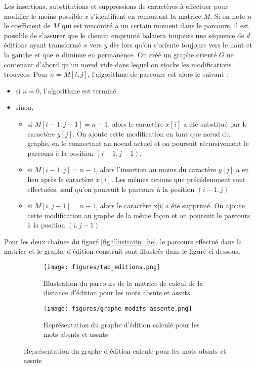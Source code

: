 \documentclass[12pt, twoside]{report}
\begin{document}
Les insertions, substitutions et suppressions de caractères à effectuer pour modifier le moins possible $x$ s'identifient en remontant la matrice $M$. Si on note $n$ le coefficient de $M$ qui est rencontré à un certain moment dans le parcours, il est possible de s'assurer que le chemin emprunté balaiera toujours une séquence de $d$ éditions ayant transformé $x$ vers $y$ dès lors qu'on s'oriente toujours vers \og{} le haut et la gauche \fg{} et que $n$ diminue en permanence. On créé un graphe orienté $G$ ne contenant d'abord qu'un n\oe{}ud vide dans lequel on stocke les modifications trouvées.\autocite[chap. 2]{jurafsky} Pour $n=M[i,j]$, l'algorithme de parcours est alors le suivant :
\begin{itemize}
    \item si $n=0$, l'algorithme est terminé.
    \item sinon, \begin{itemize}
        \item si $M[i-1, j-1] = n-1$, alors le caractère $x[i]$ a été substitué par le caractère $y[j]$. On ajoute cette modification en tant que n\oe{}ud du graphe, en le connectant au noeud actuel et on poursuit récursivement le parcours à la position $(i-1, j-1)$.
        \item si $M[i-1, j] = n-1$, alors l'insertion au moins du caractère $y[j]$ a eu lieu après le caractère $x[i]$. Les mêmes actions que précédemment sont effectuées, sauf qu'on poursuit le parcours à la position $(i-1, j)$
        \item si $M[i, j-1] = n-1$, alors le caractère x[i] a été supprimé. On ajoute cette modification au graphe de la même façon et on poursuit le parcours à la position $(i, j-1)$
    \end{itemize}
\end{itemize}
Pour les deux chaînes du figuré \ref{fig:illustratin_he}, le parcours effectué dans la matrice et le graphe d'édition construit sont illustrés dans le figuré ci-dessous.
\begin{figure}[!h]
    \centering
    \begin{subfigure}[b]{0.4\textwidth}
        \texttt{[image: figures/tab\_editions.png]}
        \caption{Illustration du parcours de la matrice de calcul de la distance d'édition pour les mots \og{} abs\textepsilon{}nts\fg{} et \og{} ass\textepsilon{}nts\fg{}}
    \end{subfigure}
    \begin{subfigure}[b]{0.4\textwidth}
        \texttt{[image: figures/graphe modifs assente.png]}
        \caption{Représentation du graphe d'édition calculé pour les mots \og{} abs\textepsilon{}nts\fg{} et \og{} ass\textepsilon{}nts\fg{}}
    \end{subfigure}
    
\end{figure}
\end{document}
